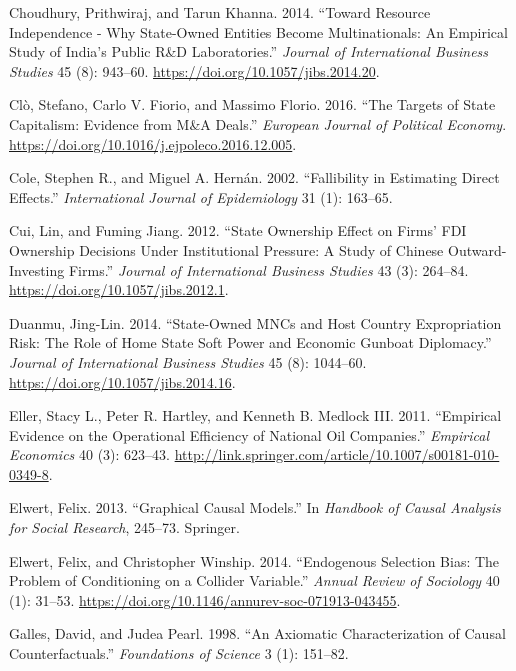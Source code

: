 \documentclass[11pt,]{book}
\begin{document}
\leavevmode\hypertarget{ref-choudhury_toward_2014}{}%
Choudhury, Prithwiraj, and Tarun Khanna. 2014. ``Toward Resource Independence - Why State-Owned Entities Become Multinationals: An Empirical Study of India's Public R\&D Laboratories.'' \emph{Journal of International Business Studies} 45 (8): 943--60. \url{https://doi.org/10.1057/jibs.2014.20}.

\leavevmode\hypertarget{ref-clo_targets_2016}{}%
Clò, Stefano, Carlo V. Fiorio, and Massimo Florio. 2016. ``The Targets of State Capitalism: Evidence from M\&A Deals.'' \emph{European Journal of Political Economy}. \url{https://doi.org/10.1016/j.ejpoleco.2016.12.005}.

\leavevmode\hypertarget{ref-cole_fallibility_2002}{}%
Cole, Stephen R., and Miguel A. Hernán. 2002. ``Fallibility in Estimating Direct Effects.'' \emph{International Journal of Epidemiology} 31 (1): 163--65.

\leavevmode\hypertarget{ref-cui_state_2012}{}%
Cui, Lin, and Fuming Jiang. 2012. ``State Ownership Effect on Firms' FDI Ownership Decisions Under Institutional Pressure: A Study of Chinese Outward-Investing Firms.'' \emph{Journal of International Business Studies} 43 (3): 264--84. \url{https://doi.org/10.1057/jibs.2012.1}.

\leavevmode\hypertarget{ref-duanmu_state-owned_2014}{}%
Duanmu, Jing-Lin. 2014. ``State-Owned MNCs and Host Country Expropriation Risk: The Role of Home State Soft Power and Economic Gunboat Diplomacy.'' \emph{Journal of International Business Studies} 45 (8): 1044--60. \url{https://doi.org/10.1057/jibs.2014.16}.

\leavevmode\hypertarget{ref-eller_empirical_2011}{}%
Eller, Stacy L., Peter R. Hartley, and Kenneth B. Medlock III. 2011. ``Empirical Evidence on the Operational Efficiency of National Oil Companies.'' \emph{Empirical Economics} 40 (3): 623--43. \url{http://link.springer.com/article/10.1007/s00181-010-0349-8}.

\leavevmode\hypertarget{ref-elwert_graphical_2013}{}%
Elwert, Felix. 2013. ``Graphical Causal Models.'' In \emph{Handbook of Causal Analysis for Social Research}, 245--73. Springer.

\leavevmode\hypertarget{ref-elwert_endogenous_2014}{}%
Elwert, Felix, and Christopher Winship. 2014. ``Endogenous Selection Bias: The Problem of Conditioning on a Collider Variable.'' \emph{Annual Review of Sociology} 40 (1): 31--53. \url{https://doi.org/10.1146/annurev-soc-071913-043455}.

\leavevmode\hypertarget{ref-galles_axiomatic_1998}{}%
Galles, David, and Judea Pearl. 1998. ``An Axiomatic Characterization of Causal Counterfactuals.'' \emph{Foundations of Science} 3 (1): 151--82.
\end{document}
